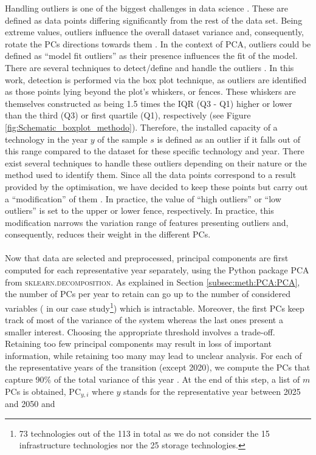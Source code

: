 \noindent
Handling outliers is one of the biggest challenges in data science \cite{aguinis2013best}. These are defined as data points differing significantly from the rest of the data set. Being extreme values, outliers influence the overall dataset variance and, consequently, rotate the PCs directions towards them \cite{stanimirova2007dealing}. In the context of \gls{PCA}, outliers could be defined as ``model fit outliers'' as their presence influences the fit of the model. There are several techniques to detect/define and handle the outliers \cite{aguinis2013best}. In this work, detection is performed via the box plot technique, as outliers are identified as those points lying beyond the plot’s whiskers, or fences. These whiskers are themselves constructed as being 1.5 times the \gls{IQR} (Q3 - Q1) higher or lower than the third (Q3) or first quartile (Q1), respectively (see Figure \ref{fig:Schematic_boxplot_methodo}). Therefore, the installed capacity of a technology in the year $y$ of the sample $s$ is defined as an outlier if it falls out of this range compared to the dataset for these specific technology and year. There exist several techniques to handle these outliers depending on their nature or the method used to identify them. Since all the data points correspond to a result provided by the optimisation, we have decided to keep these points but carry out a ``modification'' of them \cite{aguinis2013best}. In practice,  the value of ``high outliers'' or ``low outliers'' is set to the upper or lower fence, respectively. In practice, this modification narrows the variation range of features presenting outliers and, consequently, reduces their weight in the different PCs.\\

\\

\noindent
Now that data are selected and preprocessed, principal components are first computed for each representative year separately, using the Python package \textsc{PCA} from \textsc{sklearn.decomposition}. As explained in Section \ref{subsec:meth:PCA:PCA}, the number of PCs per year to retain can go up to the number of considered variables ( in our case study\footnote{73 technologies out of the 113 in total as we do not consider the 15 infrastructure technologies nor the 25 storage technologies.}) which is intractable. Moreover, the first PCs keep track of most of the variance of the system whereas the last ones present a smaller interest. Choosing the appropriate threshold involves a trade-off. Retaining too few principal components may result in loss of important information, while retaining too many may lead to unclear analysis. For each of the representative years of the transition (except 2020), we compute the PCs that capture 90\% of the total variance of this year \cite{jolliffe2002principal}. At the end of this step, a list of $m$ PCs is obtained, \ie $\text{PC}_{y,i}$ where $y$ stands for the representative year between 2025 and 2050 and 

